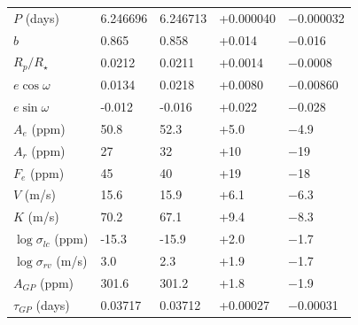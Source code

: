 \documentclass[apjl]{emulateapj}
\begin{document}
\begin{table}
\begin{tabular}{l l l l l}
$P$ 	(days)			&	6.246696		&	6.246713		&	+0.000040	&	$-$0.000032	\\
$b$ 					&	0.865		&	0.858		&	+0.014		&	$-$0.016		\\
$R_{p}/R_{\star}$		&	0.0212		&	0.0211		&	+0.0014		&	$-$0.0008		\\
$e\cos{\omega}$ 		&	0.0134		&	0.0218		&	+0.0080		&	$-$0.00860	\\
$e\sin{\omega}$ 		&	-0.012		&	-0.016		&	+0.022		&	$-$0.028		\\
$A_e$ (ppm)			&	50.8			&	52.3			&	+5.0			&	$-$4.9		\\
$A_r$ (ppm)			&	27			&	32			&	+10			&	$-$19		\\
$F_e$ (ppm)			&	45			&	40			&	+19			&	$-$18		\\
$V$ 	(m/s)				&	15.6			&	15.9			&	+6.1			&	$-$6.3		\\
$K$ 	(m/s)				&	70.2			&	67.1			&	+9.4			&	$-$8.3		\\
$\log \sigma_{lc}$ (ppm)	&	-15.3			&	-15.9			&	+2.0			&	$-$1.7		\\
$\log \sigma_{rv}$ (m/s)	&	3.0			&	2.3			&	+1.9			&	$-$1.7		\\
$A_{GP}$ (ppm)		&	301.6		&	301.2		&	+1.8			&	$-$1.9		\\
$\tau_{GP}$  (days)		&	0.03717		&	0.03712		&	+0.00027		&	$-$0.00031	\\
%
%
%
\hline

\end{tabular}
\end{table}
\end{document}
